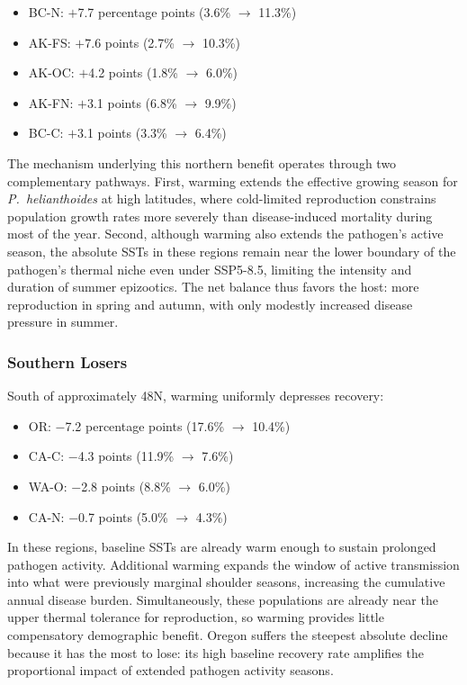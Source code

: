 \begin{itemize}
  \item BC-N: $+$7.7 percentage points (3.6\% $\rightarrow$ 11.3\%)
  \item AK-FS: $+$7.6 points (2.7\% $\rightarrow$ 10.3\%)
  \item AK-OC: $+$4.2 points (1.8\% $\rightarrow$ 6.0\%)
  \item AK-FN: $+$3.1 points (6.8\% $\rightarrow$ 9.9\%)
  \item BC-C: $+$3.1 points (3.3\% $\rightarrow$ 6.4\%)
\end{itemize}

\noindent
The mechanism underlying this northern benefit operates through two
complementary pathways.  First, warming extends the effective growing
season for \textit{P.~helianthoides} at high latitudes, where
cold-limited reproduction constrains population growth rates more
severely than disease-induced mortality during most of the year.
Second, although warming also extends the pathogen's active season,
the absolute SSTs in these regions remain near the lower boundary of
the pathogen's thermal niche even under SSP5-8.5, limiting the
intensity and duration of summer epizootics.  The net balance thus
favors the host: more reproduction in spring and autumn, with only
modestly increased disease pressure in summer.

\subsubsection{Southern Losers}

South of approximately 48\textdegree N, warming uniformly depresses
recovery:

\begin{itemize}
  \item OR: $-$7.2 percentage points (17.6\% $\rightarrow$ 10.4\%)
  \item CA-C: $-$4.3 points (11.9\% $\rightarrow$ 7.6\%)
  \item WA-O: $-$2.8 points (8.8\% $\rightarrow$ 6.0\%)
  \item CA-N: $-$0.7 points (5.0\% $\rightarrow$ 4.3\%)
\end{itemize}

\noindent
In these regions, baseline SSTs are already warm enough to sustain
prolonged pathogen activity.  Additional warming expands the window of
active transmission into what were previously marginal shoulder
seasons, increasing the cumulative annual disease burden.
Simultaneously, these populations are already near the upper thermal
tolerance for reproduction, so warming provides little compensatory
demographic benefit.  Oregon suffers the steepest absolute decline
because it has the most to lose: its high baseline recovery rate
amplifies the proportional impact of extended pathogen activity seasons.

